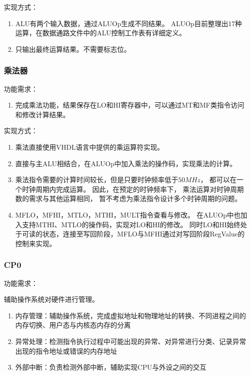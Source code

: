             实现方式：
            \begin{enumerate}
            \item
            ALU有两个输入数据，通过ALUOp生成不同结果。%
            ALUOp目前整理出17种运算，在数据通路文件中的ALU控制工作表有详细定义。
            \item
            只输出最终运算结果。不需要标志位。
            \end{enumerate}

        \subsubsection{乘法器}
            功能需求：
            \begin{enumerate}
            \item
            完成乘法功能，结果保存在LO和HI寄存器中，可以通过MT和MF类指令访问和修改计算结果。
            \end{enumerate}

            实现方式：
            \begin{enumerate}
            \item
            乘法直接使用VHDL语言中提供的乘运算符实现。
            \item
            直接与主ALU相结合，在ALUOp中加入乘法的操作码，实现乘法的计算。
            \item
            乘法指令需要的计算时间较长，但是只要时钟频率低于$50MHz$，%
            都可以在一个时钟周期内完成运算。%
            因此，在预定的时钟频率下，%
            乘法运算对时钟周期数的需求与其他运算相同，%
            暂不考虑为乘法指令设计多个时钟周期的问题。
            \item
            MFLO，MFHI，MTLO，MTHI，MULT指令查看与修改。
            在ALUOp中也加入支持MTHI、MTLO的操作码，实现对LO和HI的修改。
            同时LO和HI始终处于可读的状态，连接至写回阶段，MFLO与MFHI通过对写回阶段RegValue的控制来实现。
            \end{enumerate}

        \subsubsection{CP0}
            功能需求：

            辅助操作系统对硬件进行管理。
            \begin{enumerate}
            \item
                内存管理：辅助操作系统，完成虚拟地址和物理地址的转换、不同进程之间的内存切换、用户态与内核态内存的分离
            \item
                异常处理：检测指令执行过程中可能出现的异常、对异常进行分类、记录异常出现的指令地址或错误的内存地址
            \item
                外部中断：负责检测外部中断，辅助实现CPU与外设之间的交互

            \end{enumerate}

